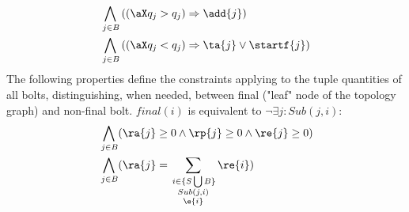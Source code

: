 %
\begin{align*}
 \bigwedge_{
\begin{subarray}{c}
\,j \in B
\end{subarray}
} &\left( (\aX q_j > q_j) 
\Rightarrow 
\add{j}\right)\\
%
%
 \bigwedge_{
\begin{subarray}{c}
\,j \in B
\end{subarray}
} &\left( (\aX q_j < q_j) 
\Rightarrow 
\ta{j} \lor \startf{j} \right)
\end{align*}
%
The following properties define the constraints applying to the tuple quantities of all bolts, distinguishing, when needed, between final ("leaf" node of the topology graph) and non-final bolt. $\mathit{final}(i)$ is equivalent to $\lnot \exists j: Sub(j,i)$:
%
%
\begin{align*}
& \bigwedge_{
\begin{subarray}{c}
\,j \in B
\end{subarray}
} ( \ra{j} \geq 0 \land \rp{j} \geq 0 \land \re{j} \geq 0 ) \\
%
%
& \bigwedge_{
\begin{subarray}{c}
\,j \in B
\end{subarray}
} ( \ra{j} = \sum_{
\begin{subarray}{c}
\,i \in \{S \bigcup B \}\\
Sub(j,i) \\
\e{i}
\end{subarray}
 } \re{i})
%
%
\end{align*}
%
%
